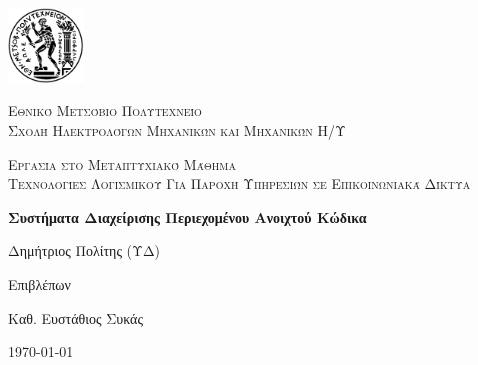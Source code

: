 \documentclass[12pt]{report}
\newcommand\blankpage{%
    \null
    \thispagestyle{empty}%
    \addtocounter{page}{-1}%
    \newpage}
\begin{document}

\hypersetup{pageanchor=false}

\begin{titlepage}
  \centering
  \includegraphics[width=0.15\textwidth]{pyrforos}\par\vspace{1cm}
  {\scshape\LARGE Εθνικό Μετσόβιο Πολυτεχνείο\\
  Σχολή Ηλεκτρολόγων Μηχανικών και Μηχανικών Η/Υ\par}
  \vspace{1cm}
  {\scshape\Large Εργασία στο Μεταπτυχιακό Μάθημα\\
  Τεχνολογίες Λογισμικού Για Παροχή Υπηρεσιών σε Επικοινωνιακά Δίκτυα\par}
  \vspace{1.5cm}
  {\Large\bfseries Συστήματα Διαχείρισης Περιεχομένου Ανοιχτού Κώδικα\par}
  \vspace{2cm}
  {\large Δημήτριος Πολίτης (ΥΔ)\par}
  \vfill
  Επιβλέπων \par
  Καθ. Ευστάθιος Συκάς

  \vfill

  {\large \today\par}
  \afterpage{\blankpage}
\end{titlepage}

\tableofcontents
\thispagestyle{empty}

\listoftables
\thispagestyle{empty}

\listoffigures
\thispagestyle{empty}

\begin{abstract}
Στο παρόν μελετώνται τα λογισμικά ανοιχτού κώδικα, τα οποία αφορούν σε διαχείριση περιεχομένου, με έμφαση στο \textlatin{web content} και τις δυναμικές ιστοσελίδες. Παρουσιάζονται αρχικά τα διαθέσιμα λογισμικά, τα πλεονεκτήματα και μειονεκτήματά τους και στη συνέχεια περιγράφεται αναλυτικά η διαδικασία δημιουργίας ενός ιστοτόπου \textlatin{Drupal} με τη χρήση αυτοματοποιημένων εργαλείων (\textlatin{vagrant}). Η εργασία και ο σχετικός κώδικας είναι διαθέσιμα από το \textlatin{\url{https://github.com/dpolitis/gnu-cms}}.

\vspace{10mm}

\noindent \textbf{Λέξεις κλειδιά:} Συστήματα Διαχείρισης Περιεχομένου, Ανοιχτός Κώδικας, Εξυπηρετητής Ιστοσελίδων, Διαδίκτυο.
\end{abstract}
\end{document}
